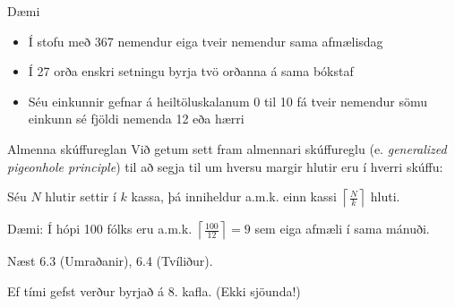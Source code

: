 \documentclass{beamer}
\begin{document}
\begin{frame}{Dæmi}
\begin{itemize}
 \item Í stofu með 367 nemendur eiga tveir nemendur sama afmælisdag
 \item Í 27 orða enskri setningu byrja tvö orðanna á sama bókstaf
 \item Séu einkunnir gefnar á heiltöluskalanum 0 til 10 fá tveir nemendur sömu einkunn sé fjöldi nemenda 12 eða hærri
\end{itemize}
\end{frame}

\begin{frame}{Almenna skúffureglan}
Við getum sett fram almennari skúffureglu (e. \emph{generalized pigeonhole principle}) til að segja til um hversu margir hlutir eru í hverri skúffu:
\begin{tcolorbox}[title=Almenna skúffureglan]
Séu $N$ hlutir settir í $k$ kassa, þá inniheldur a.m.k. einn kassi $\left\lceil \frac{N}{k}\right\rceil$ hluti.
\end{tcolorbox}
Dæmi: Í hópi 100 fólks eru a.m.k. $\left\lceil \frac{100}{12}\right\rceil = 9$ sem eiga afmæli í sama mánuði.

\end{frame}

\begin{frame}{Næst}
6.3 (Umraðanir), 6.4 (Tvíliður).

Ef tími gefst verður byrjað á 8. kafla. (Ekki sjöunda!)
\end{frame}
\end{document}
